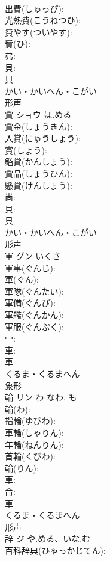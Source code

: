 \documentclass[8pt]{extreport}
\begin{document}
\begin{CJK}{UTF8}{min}
\\	出費(しゅっぴ): 
\\	光熱費(こうねつひ): 
\\	費やす(ついやす): 
\\	費(ひ): 
\\	弗: 
\\	貝: 
\\	貝	
\\	かい・かいへん・こがい	
\\	形声 
\\	賞	ショウ	ほ.める		
\\	賞金(しょうきん): 
\\	入賞(にゅうしょう): 
\\	賞(しょう): 
\\	鑑賞(かんしょう): 
\\	賞品(しょうひん): 
\\	懸賞(けんしょう): 
\\	尚: 
\\	貝: 
\\	貝	
\\	かい・かいへん・こがい	
\\	形声 
\\	軍	グン	いくさ		
\\	軍事(ぐんじ): 
\\	軍(ぐん): 
\\	軍隊(ぐんたい): 
\\	軍備(ぐんび): 
\\	軍艦(ぐんかん): 
\\	軍服(ぐんぷく): 
\\	冖: 
\\	車: 
\\	車	
\\	くるま・くるまへん	
\\	象形 
\\	輪	リン	わ	なわ, も	
\\	輪(わ): 
\\	指輪(ゆびわ): 
\\	車輪(しゃりん): 
\\	年輪(ねんりん): 
\\	首輪(くびわ): 
\\	輪(りん): 
\\	車: 
\\	侖: 
\\	車	
\\	くるま・くるまへん	
\\	形声 
\\	辞	ジ	や.める、いな.む		
\\	百科辞典(ひゃっかじてん): 

\end{CJK}
\end{document}
